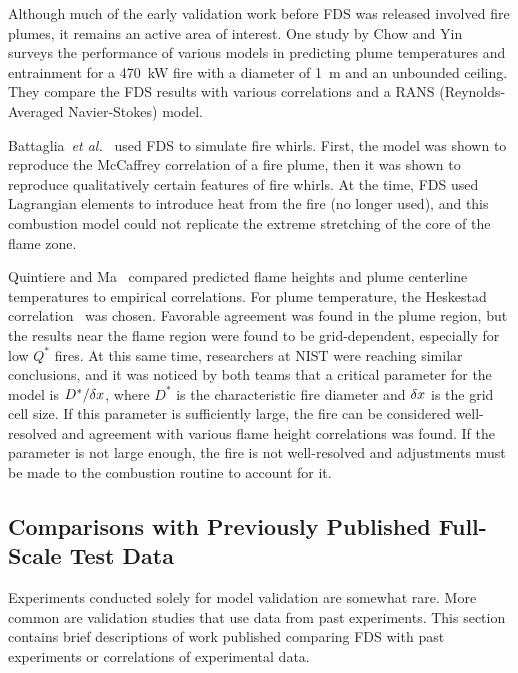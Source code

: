 Although much  of the  early validation work  before FDS  was released involved fire plumes, it remains an active area of interest. One study by
Chow  and Yin~\cite{Chow:1}  surveys  the  performance of  various models in predicting plume temperatures and entrainment for a 470~kW fire with a
diameter of  1~m and an  unbounded ceiling.  They compare the FDS results with various
correlations and a  RANS (Reynolds-Averaged Navier-Stokes) model.

Battaglia~{\em  et al.}~\cite{Battaglia:1} used  FDS to  simulate fire whirls.   First,  the  model  was  shown to  reproduce  the  McCaffrey
correlation  of  a  fire  plume,   then  it  was  shown  to  reproduce qualitatively certain features  of fire whirls. At the  time, FDS used
Lagrangian elements to introduce heat  from the fire (no longer used), and this  combustion model could not replicate  the extreme stretching of the
core of the flame zone.

Quintiere and Ma~\cite{Ma:2,Ma:3} compared predicted flame heights and plume  centerline temperatures to  empirical correlations.   For plume
temperature,   the  Heskestad   correlation~\cite{SFPE:Heskestad}  was chosen.  Favorable  agreement was found  in the plume region,  but the results
near  the  flame  region  were found  to  be  grid-dependent, especially for  low $Q^*$  fires.  At this  same time,  researchers at NIST were
reaching similar  conclusions, and it  was noticed  by both teams  that a  critical parameter  for the  model is  $D^*/\delta x$, where $D^*$ is the
characteristic fire diameter and $\delta x$  is the grid cell size.  If  this parameter  is  sufficiently  large,  the fire  can  be considered
well-resolved  and  agreement  with various  flame  height correlations was found. If the parameter is not large enough, the fire is not
well-resolved and adjustments  must be made to  the combustion routine to account for it.



\subsection{Comparisons with Previously Published Full-Scale Test Data}
\label{prevpub}

Experiments  conducted  solely   for  model  validation  are  somewhat rare.  More common  are validation  studies  that use  data from  past
experiments.  This   section  contains  brief   descriptions  of  work published  comparing  FDS with  past  experiments  or correlations  of
experimental data.

